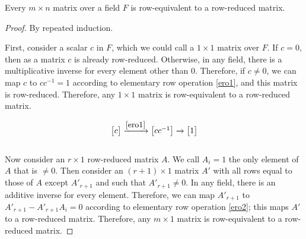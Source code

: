 \documentclass[12pt]{article}
\begin{document}
\begin{thm} \label{thm:roweqrowred}
  Every $m \times n$ matrix over a field $F$ is row-equivalent to
  a row-reduced matrix.
  \begin{proof}
    By repeated induction.

    First, consider a scalar $c$ in $F$, which we could call a $1
    \times 1$ matrix over $F$. If $c = 0$, then as a matrix $c$
    is already row-reduced. Otherwise, in any field, there is a
    multiplicative inverse for every element other than $0$.
    Therefore, if $c \neq 0$, we can map $c$ to $cc^{-1} = 1$
    according to elementary row operation \eqref{ero1}, and this
    matrix is row-reduced. Therefore, any $1 \times 1$ matrix is
    row-equivalent to a row-reduced matrix.

    \begin{align*}
      \begin{bmatrix}
        c
      \end{bmatrix}
      \xrightarrow{\eqref{ero1}}
      \begin{bmatrix}
        cc^{-1}
      \end{bmatrix}
      \xrightarrow{}
      \begin{bmatrix}
        1
      \end{bmatrix}
    \end{align*}\\

    Now consider an $r \times 1$ row-reduced matrix $A$. We call
    $A_{i} = 1$ the only element of $A$ that is $\neq 0$. Then
    consider an $(r + 1) \times 1$ matrix $A'$ with all rows
    equal to those of $A$ except $A'_{r + 1}$ and such that
    $A'_{r + 1} \neq 0$. In any field, there is an additive
    inverse for every element. Therefore, we can map $A'_{r + 1}$
    to $A'_{r + 1} - A'_{r + 1}A_{i} = 0$ according to elementary
    row operation \eqref{ero2}; this maps $A'$ to a row-reduced
    matrix. Therefore, any $m \times 1$ matrix is row-equivalent
    to a row-reduced matrix.


\end{proof}
\end{thm}
\end{document}
